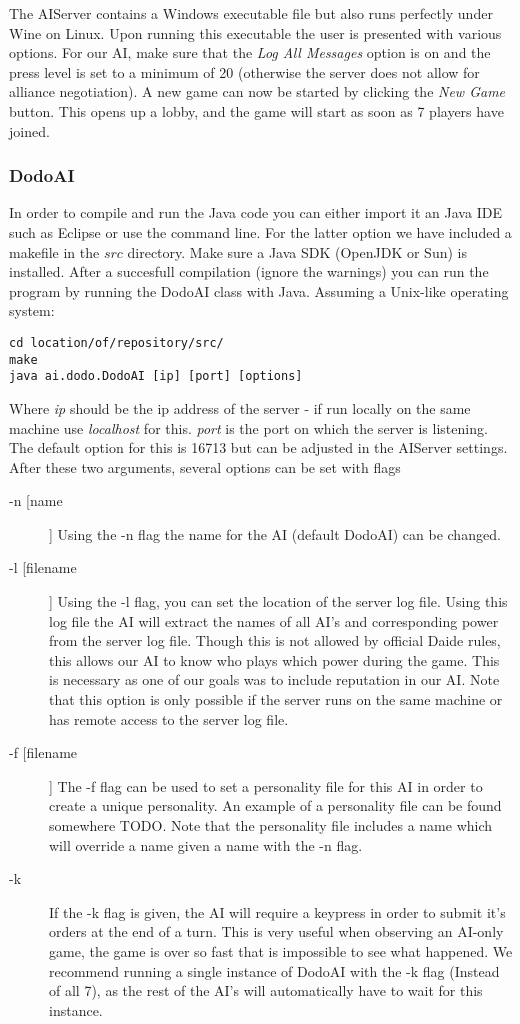 \documentclass[a4paper]{article} %
\begin{document}
The AIServer contains a Windows executable file but also runs perfectly under Wine on Linux. Upon running this executable the user is presented with various options. For our AI, make sure that the \textit{Log All Messages} option is on and the press level is set to a minimum of 20 (otherwise the server does not allow for alliance negotiation). A new game can now be started by clicking the \textit{New Game} button. This opens up a lobby, and the game will start as soon as 7 players have joined.     

\subsubsection{DodoAI}
In order to compile and run the Java code you can either import it an Java IDE such as Eclipse or use the command line. For the latter option we have included a makefile in the $src$ directory. Make sure a Java SDK (OpenJDK or Sun) is installed. After a succesfull compilation (ignore the warnings) you can run the program by running the DodoAI class with Java. Assuming a Unix-like operating system:       
\begin{lstlisting}[frame=single] 
cd location/of/repository/src/
make
java ai.dodo.DodoAI [ip] [port] [options]
\end{lstlisting}

Where \textit{ip} should be the ip address of the server - if run locally on the same machine use \textit{localhost} for this. \textit{port} is the port on which the server is listening. The default option for this is 16713 but can be adjusted in the AIServer settings. After these two arguments, several options can be set with flags

\begin{description}
\item[-n [name]] Using the -n flag the name for the AI (default DodoAI) can be changed. 
\item[-l [filename]] Using the -l flag, you can set the location of the server log file. Using this log file the AI will extract the names of all AI's and corresponding power from the server log file. Though this is not allowed by official Daide rules, this allows our AI to know who plays which power during the game. This is necessary as one of our goals was to include reputation in our AI. Note that this option is only possible if the server runs on the same machine or has remote access to the server log file.  
\item[-f [filename]] The -f flag can be used to set a personality file for this AI in order to create a unique personality. An example of a personality file can be found somewhere TODO. Note that the personality file includes a name which will override a name given a name with the -n flag.  %
\item[-k] If the -k flag is given, the AI will require a keypress in order to submit it's orders at the end of a turn. This is very useful when observing an AI-only game, the game is over so fast that is impossible to see what happened. We recommend running a single instance of DodoAI with the -k flag (Instead of all 7), as the rest of the AI's will automatically have to wait for this instance.  
\end{description} 
\end{document}
